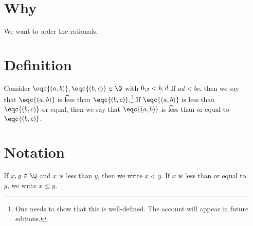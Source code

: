 
\section*{Why}

We want to order the rationals.

\section*{Definition}

Consider $\eqc{(a, b)}, \eqc{(b, c)} \in \Q $ with $0_{\Z } < b, d$
If $ad < bc$, then we say that $\eqc{(a, b)}$ is \t{less than} $\eqc{(b, c)}$.\footnote{One needs to show that this is well-defined. The account will appear in future editions.}
If $\eqc{(a, b)}$ is less than $\eqc{(b, c)}$ or equal, then we say that $\eqc{(a, b)}$ is \t{less than or equal to} $\eqc{(b, c)}$.

\section*{Notation}

If $x, y \in \Q $ and $x$ is less than $y$, then we write $x < y$.
If $x$ is less than or equal to $y$, we write $x \leq y$.

\blankpage